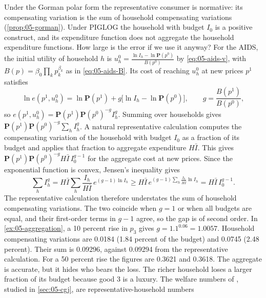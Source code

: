 \begin{remark}\label{rem:05-agg-welfare}
Under the Gorman polar form the representative consumer is normative: its compensating variation is the
sum of household compensating variations (\cref{prop:05-gorman}). Under PIGLOG the household with budget
$I_0$ is a positive construct, and its expenditure function does not aggregate the household expenditure
functions. How large is the error if we use it anyway? For the AIDS, the initial utility of household $h$
is $u_h^0 = \frac{\ln I_h - \ln\mathbf{P}(p^0)}{B(p^0)}$ by \eqref{eq:05-aids-v}, with $B(p) =
\beta_0\prod_k p_k^{\beta_k}$ as in \eqref{eq:05-aids-B}. Its cost of reaching $u_h^0$ at new prices $p^1$
satisfies
\begin{equation*}
  \ln e(p^1, u_h^0) = \ln\mathbf{P}(p^1) + g\bigl[\ln I_h - \ln\mathbf{P}(p^0)\bigr],
  \qquad g = \frac{B(p^1)}{B(p^0)} ,
\end{equation*}
so $e(p^1, u_h^0) = \mathbf{P}(p^1)\mathbf{P}(p^0)^{-g} I_h^{g}$. Summing over households gives
$\mathbf{P}(p^1)\mathbf{P}(p^0)^{-g}\sum_h I_h^g$. A natural representative calculation computes the
compensating variation of the household with budget $I_0$ as a fraction of its budget and applies that
fraction to aggregate expenditure $H\bar I$. This gives $\mathbf{P}(p^1)\mathbf{P}(p^0)^{-g} H\bar I\,
I_0^{g-1}$ for the aggregate cost at new prices. Since the exponential function is convex, Jensen's
inequality gives
\begin{equation*}
  \sum_h I_h^{g} = H\bar I\sum_h \frac{I_h}{H\bar I}\, e^{(g-1)\ln I_h}
  \ge H\bar I\, e^{(g-1)\sum_h \frac{I_h}{H\bar I}\ln I_h} = H\bar I\, I_0^{g-1}.
\end{equation*}
The representative calculation therefore understates the sum of household compensating variations. The
two coincide when $g = 1$ or when all budgets are equal, and their first-order terms in $g - 1$ agree, so
the gap is of second order. In \cref{ex:05-aggregation}, a 10 percent rise in $p_3$ gives $g = 1.1^{0.06}
= 1.0057$. Household compensating variations are 0.0184 (1.84 percent of the budget) and 0.0745 (2.48
percent). Their sum is 0.09296, against 0.09294 from the representative calculation. For a 50 percent
rise the figures are 0.3621 and 0.3618. The aggregate is accurate, but it hides who bears the loss. The
richer household loses a larger fraction of its budget because good 3 is a luxury. The welfare numbers
of \citet{ChaudhuriGoldbergJia2006}, studied in \cref{sec:05-cgj}, are representative-household numbers

\end{remark}

